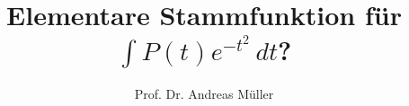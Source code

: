 %
%
%


\beamertemplatenavigationsymbolsempty
\title[$\int P(t)e^{-t^2}\,dt$]{Elementare Stammfunktion für
$\displaystyle\int P(t)e^{-t^2}\,dt$?}
\author[A.~Müller]{Prof. Dr. Andreas Müller}
\date[]{}

